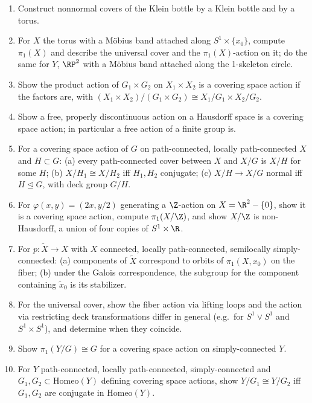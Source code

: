 \begin{enumerate}
\item Construct nonnormal covers of the Klein bottle by a Klein bottle and by a
torus.

\item For $X$ the torus with a M\"obius band attached along $S^1\times\{x_0\}$,
compute $\pi_1(X)$ and describe the universal cover and the $\pi_1(X)$-action on
it; do the same for $Y$, $\RP^2$ with a M\"obius band attached along the 1-skeleton
circle.

\item Show the product action of $G_1\times G_2$ on $X_1\times X_2$ is a covering
space action if the factors are, with $(X_1\times X_2)/(G_1\times G_2) \cong
X_1/G_1\times X_2/G_2$.

\item Show a free, properly discontinuous action on a Hausdorff space is a
covering space action; in particular a free action of a finite group is.

\item For a covering space action of $G$ on path-connected, locally
path-connected $X$ and $H\subset G$: (a) every path-connected cover between $X$
and $X/G$ is $X/H$ for some $H$; (b) $X/H_1\cong X/H_2$ iff $H_1,H_2$ conjugate;
(c) $X/H\to X/G$ normal iff $H\trianglelefteq G$, with deck group $G/H$.

\item For $\varphi(x,y)=(2x,y/2)$ generating a $\Z$-action on
$X=\R^2-\{0\}$, show it is a covering space action, compute $\pi_1(X/\Z)$, and
show $X/\Z$ is non-Hausdorff, a union of four copies of $S^1\times\R$.

\item For $p:\tilde X\to X$ with $X$ connected, locally path-connected, semilocally
simply-connected: (a) components of $\tilde X$ correspond to orbits of
$\pi_1(X,x_0)$ on the fiber; (b) under the Galois correspondence, the subgroup for
the component containing $\tilde x_0$ is its stabilizer.

\item For the universal cover, show the fiber action via lifting loops and the
action via restricting deck transformations differ in general (e.g.\ for
$S^1\vee S^1$ and $S^1\times S^1$), and determine when they coincide.

\item Show $\pi_1(Y/G) \cong G$ for a covering space action on simply-connected
$Y$.

\item For $Y$ path-connected, locally path-connected, simply-connected and
$G_1,G_2\subset\mathrm{Homeo}(Y)$ defining covering space actions, show
$Y/G_1\cong Y/G_2$ iff $G_1,G_2$ are conjugate in $\mathrm{Homeo}(Y)$.


\end{enumerate}
